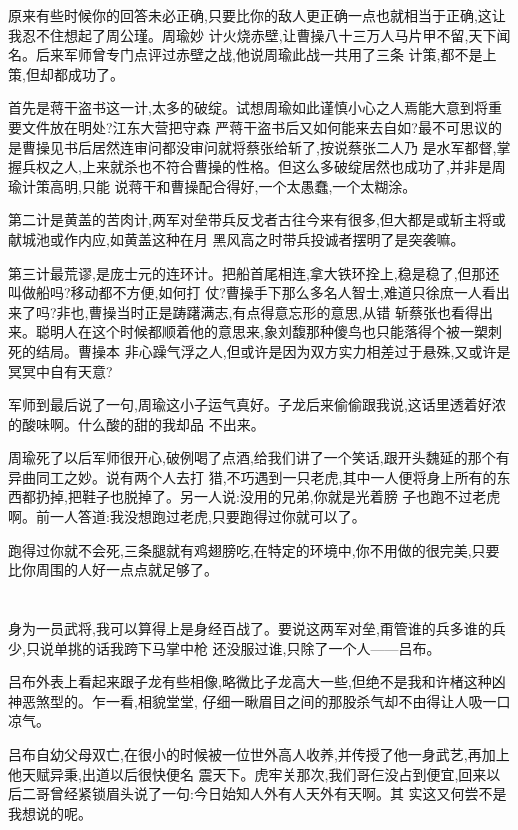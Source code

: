 ﻿\documentclass[12pt,twocolumn]{article}
\begin{document}
原来有些时候你的回答未必正确,只要比你的敌人更正确一点也就相当于正确,这让我忍不住想起了周公瑾。周瑜妙
计火烧赤壁,让曹操八十三万人马片甲不留,天下闻名。后来军师曾专门点评过赤壁之战,他说周瑜此战一共用了三条
计策,都不是上策,但却都成功了。

首先是蒋干盗书这一计,太多的破绽。试想周瑜如此谨慎小心之人焉能大意到将重要文件放在明处?江东大营把守森
严蒋干盗书后又如何能来去自如?最不可思议的是曹操见书后居然连审问都没审问就将蔡张给斩了,按说蔡张二人乃
是水军都督,掌握兵权之人,上来就杀也不符合曹操的性格。但这么多破绽居然也成功了,并非是周瑜计策高明,只能
说蒋干和曹操配合得好,一个太愚蠢,一个太糊涂。

第二计是黄盖的苦肉计,两军对垒带兵反戈者古往今来有很多,但大都是或斩主将或献城池或作内应,如黄盖这种在月
黑风高之时带兵投诚者摆明了是突袭嘛。

第三计最荒谬,是庞士元的连环计。把船首尾相连,拿大铁环拴上,稳是稳了,但那还叫做船吗?移动都不方便,如何打
仗?曹操手下那么多名人智士,难道只徐庶一人看出来了吗?非也,曹操当时正是踌躇满志,有点得意忘形的意思,从错
斩蔡张也看得出来。聪明人在这个时候都顺着他的意思来,象刘馥那种傻鸟也只能落得个被一槊刺死的结局。曹操本
非心躁气浮之人,但或许是因为双方实力相差过于悬殊,又或许是冥冥中自有天意?

军师到最后说了一句,周瑜这小子运气真好。子龙后来偷偷跟我说,这话里透着好浓的酸味啊。什么酸的甜的我却品
不出来。

周瑜死了以后军师很开心,破例喝了点酒,给我们讲了一个笑话,跟开头魏延的那个有异曲同工之妙。说有两个人去打
猎,不巧遇到一只老虎,其中一人便将身上所有的东西都扔掉,把鞋子也脱掉了。另一人说:没用的兄弟,你就是光着膀
子也跑不过老虎啊。前一人答道:我没想跑过老虎,只要跑得过你就可以了。

跑得过你就不会死,三条腿就有鸡翅膀吃,在特定的环境中,你不用做的很完美,只要比你周围的人好一点点就足够了。

\section{}

身为一员武将,我可以算得上是身经百战了。要说这两军对垒,甭管谁的兵多谁的兵少,只说单挑的话我跨下马掌中枪
还没服过谁,只除了一个人——吕布。

吕布外表上看起来跟子龙有些相像,略微比子龙高大一些,但绝不是我和许楮这种凶神恶煞型的。乍一看,相貌堂堂,
仔细一瞅眉目之间的那股杀气却不由得让人吸一口凉气。

吕布自幼父母双亡,在很小的时候被一位世外高人收养,并传授了他一身武艺,再加上他天赋异秉,出道以后很快便名
震天下。虎牢关那次,我们哥仨没占到便宜,回来以后二哥曾经紧锁眉头说了一句:今日始知人外有人天外有天啊。其
实这又何尝不是我想说的呢。
\end{document}
